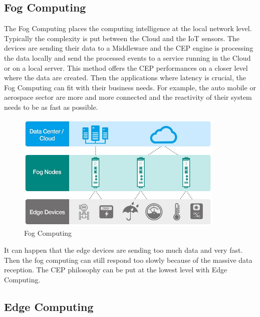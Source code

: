 \documentclass[11pt]{article}
\begin{document}

\subsection{Fog Computing}

The Fog Computing places the computing intelligence at the local network level. Typically the complexity is put between the Cloud and the IoT sensors. The devices are sending their data to a Middleware and the CEP engine is processing the data locally and send the processed events to a service running in the Cloud or on a local server. This method offers the CEP performances on a closer level where the data are created. Then the applications where latency is crucial, the Fog Computing can fit with their business needs. For example, the auto mobile or aerospace sector are more and more connected and the reactivity of their system needs to be as fast as possible.
\newline
\begin{figure}[H]
	\includegraphics[width=\textwidth,height=160pt]{assets/Fog_Computing.jpg}
	\caption{Fog Computing}
	\label{fig:Fog-Computing}
\end{figure}

It can happen that the edge devices are sending too much data and very fast. Then the fog computing can still respond too slowly because of the massive data reception. The CEP philosophy can be put at the lowest level with Edge Computing.


\subsection{Edge Computing}
\end{document}
